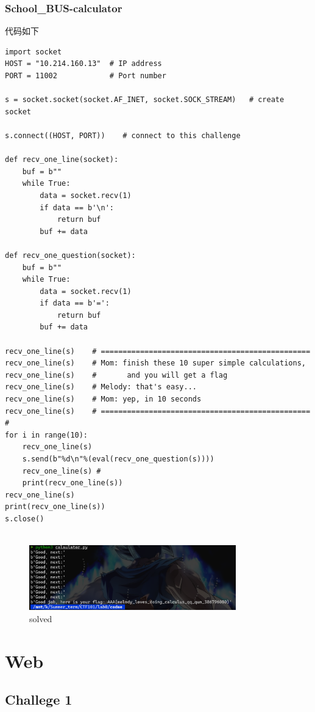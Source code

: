 \documentclass{article}
\begin{document}
          \subsubsection*{School_BUS-calculator}
          代码如下
        \begin{verbatim}
import socket
HOST = "10.214.160.13"  # IP address
PORT = 11002            # Port number

s = socket.socket(socket.AF_INET, socket.SOCK_STREAM)   # create socket

s.connect((HOST, PORT))    # connect to this challenge

def recv_one_line(socket):
    buf = b""
    while True:
        data = socket.recv(1)
        if data == b'\n':
            return buf
        buf += data

def recv_one_question(socket):
    buf = b""
    while True:
        data = socket.recv(1)
        if data == b'=':
            return buf
        buf += data
        
recv_one_line(s)    # ================================================
recv_one_line(s)    # Mom: finish these 10 super simple calculations,
recv_one_line(s)    #       and you will get a flag
recv_one_line(s)    # Melody: that's easy...
recv_one_line(s)    # Mom: yep, in 10 seconds
recv_one_line(s)    # ================================================   #
for i in range(10):
    recv_one_line(s) 
    s.send(b"%d\n"%(eval(recv_one_question(s))))
    recv_one_line(s) #        
    print(recv_one_line(s))
recv_one_line(s)
print(recv_one_line(s))
s.close()
            
        \end{verbatim}
    \begin{figure}[H]
        \centering
        \includegraphics[width=0.8\textwidth]{./figure/solved.png}
        \caption{solved}
     \end{figure} 
\section*{Web}
\subsection*{Challege 1}
\end{document}
